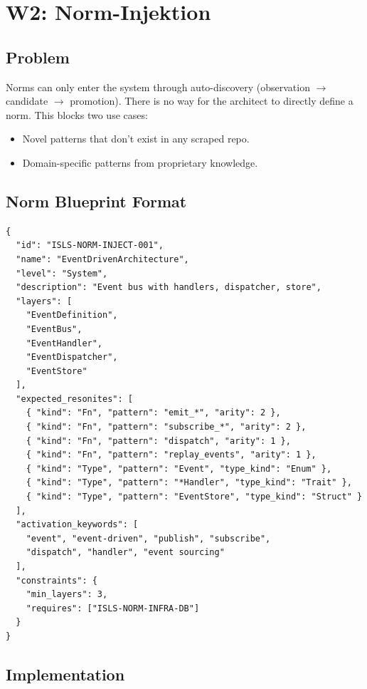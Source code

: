 \documentclass[11pt,a4paper]{article}
\begin{document}
\section{W2: Norm-Injektion}
\label{sec:w2}

\subsection{Problem}

Norms can only enter the system through auto-discovery 
(observation $\to$ candidate $\to$ promotion). There is no 
way for the architect to directly define a norm. This blocks 
two use cases:
\begin{itemize}[nosep]
\item Novel patterns that don't exist in any scraped repo.
\item Domain-specific patterns from proprietary knowledge.
\end{itemize}

\subsection{Norm Blueprint Format}

\begin{lstlisting}[style=json]
{
  "id": "ISLS-NORM-INJECT-001",
  "name": "EventDrivenArchitecture",
  "level": "System",
  "description": "Event bus with handlers, dispatcher, store",
  "layers": [
    "EventDefinition",
    "EventBus",
    "EventHandler",
    "EventDispatcher",
    "EventStore"
  ],
  "expected_resonites": [
    { "kind": "Fn", "pattern": "emit_*", "arity": 2 },
    { "kind": "Fn", "pattern": "subscribe_*", "arity": 2 },
    { "kind": "Fn", "pattern": "dispatch", "arity": 1 },
    { "kind": "Fn", "pattern": "replay_events", "arity": 1 },
    { "kind": "Type", "pattern": "Event", "type_kind": "Enum" },
    { "kind": "Type", "pattern": "*Handler", "type_kind": "Trait" },
    { "kind": "Type", "pattern": "EventStore", "type_kind": "Struct" }
  ],
  "activation_keywords": [
    "event", "event-driven", "publish", "subscribe",
    "dispatch", "handler", "event sourcing"
  ],
  "constraints": {
    "min_layers": 3,
    "requires": ["ISLS-NORM-INFRA-DB"]
  }
}
\end{lstlisting}

\subsection{Implementation}
\end{document}
